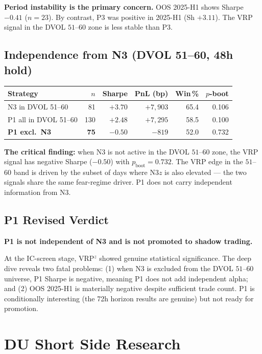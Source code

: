 \documentclass[12pt, a4paper]{article}
\theoremstyle{plain}
\theoremstyle{definition}
\begin{document}
\textbf{Period instability is the primary concern.}  OOS 2025-H1 shows
Sharpe $-0.41$ ($n = 23$).  By contrast, P3 was positive in 2025-H1
(Sh $+3.11$).  The VRP signal in the DVOL $51$--$60$ zone is less stable
than P3.

\subsection{Independence from N3 (DVOL 51--60, 48h hold)}

\begin{center}
\begin{tabular}{lrrrrr}
\toprule
Strategy & $n$ & Sharpe & PnL (bp) & Win\,\% & $p$-boot \\
\midrule
N3 in DVOL 51--60         &  81 & $+3.70$ & $+7{,}903$ & 65.4 & 0.106 \\
P1 all in DVOL 51--60     & 130 & $+2.48$ & $+7{,}295$ & 58.5 & 0.100 \\
\textbf{P1 excl.\ N3}     & \textbf{75} & $-0.50$ & $-819$ & 52.0 & 0.732 \\
\bottomrule
\end{tabular}
\end{center}

\textbf{The critical finding:} when N3 is not active in the DVOL $51$--$60$
zone, the VRP signal has negative Sharpe ($-0.50$) with $p_{\mathrm{boot}}
= 0.732$.  The VRP edge in the $51$--$60$ band is driven by the subset
of days where N3$z$ is also elevated --- the two signals share the same
fear-regime driver.  P1 does not carry independent information from N3.

\subsection{P1 Revised Verdict}

\textbf{P1 is not independent of N3 and is not promoted to shadow trading.}

At the IC-screen stage, VRP$^z$ showed genuine statistical significance.
The deep dive reveals two fatal problems: (1) when N3 is excluded from
the DVOL $51$--$60$ universe, P1 Sharpe is negative, meaning P1 does not
add independent alpha; and (2) OOS 2025-H1 is materially negative
despite sufficient trade count.  P1 is conditionally interesting (the
72h horizon results are genuine) but not ready for promotion.

\section{DU Short Side Research}
\label{sec:du_short}
\end{document}
